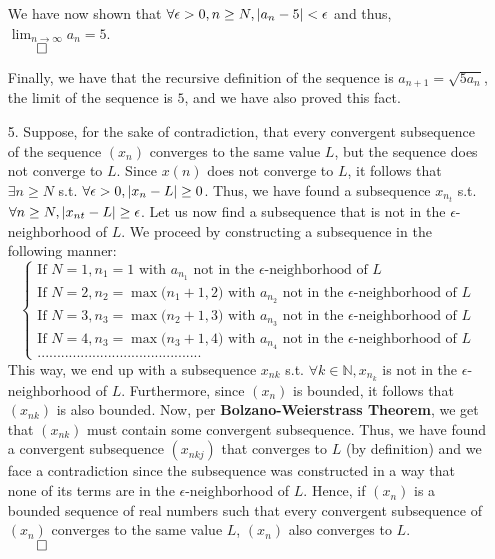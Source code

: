 \documentclass[11pt]{article}
\DeclarePairedDelimiter\abs{\lvert}{\rvert}%
\newcommand{\nats}{\mathbb{N}}
\begin{document}
\begin{itemize}
            We have now shown that $\forall \epsilon > 0, n \geq N, \abs{a_n - 5}
            < \epsilon$ and thus, $\displaystyle\lim_{n \to \infty} a_n = 5$.\\
            $\qed$

            Finally, we have that the recursive definition of the sequence is
            $a_{n + 1} = \sqrt{5a_{n}}$, the limit of the sequence is $5$, and
            we have also proved this fact.

        \newpage
        \item[5.]
            Suppose, for the sake of contradiction, that every convergent
            subsequence of the sequence $(x_n)$ converges to the same value
            $L$, but the sequence does not converge to $L$. Since $x(n)$ does
            not converge to $L$, it follows that $\exists n \geq N$ s.t.
            $\forall \epsilon > 0, \abs{x_n - L} \geq 0$. Thus, we have found a
            subsequence $x_{n_t}$ s.t. $\forall n \geq N, \abs{x_{nt} - L} \geq
            \epsilon$. Let us now find a subsequence that is not in the
            $\epsilon$-neighborhood of $L$. We proceed by constructing a
            subsequence in the following manner:
            \begin{equation*}
                \begin{cases}
                    \text{If } N = 1, n_1 = 1                  \text{ with } a_{n_1} \text{ not in the $\epsilon$-neighborhood of } L\\
                    \text{If } N = 2, n_2 = \max{(n_1 + 1, 2}) \text{ with } a_{n_2} \text{ not in the $\epsilon$-neighborhood of } L\\
                    \text{If } N = 3, n_3 = \max{(n_2 + 1, 3}) \text{ with } a_{n_3} \text{ not in the $\epsilon$-neighborhood of } L\\
                    \text{If } N = 4, n_3 = \max{(n_3 + 1, 4}) \text{ with } a_{n_4} \text{ not in the $\epsilon$-neighborhood of } L\\
                    ..........................................
                \end{cases}
            \end{equation*}
            This way, we end up with a subsequence $x_{nk}$ s.t. $\forall k \in
            \nats, x_{n_k}$ is not in the $\epsilon$-neighborhood of $L$.
            Furthermore, since $(x_n)$ is bounded, it follows that $(x_{nk})$
            is also bounded. Now, per \textbf{Bolzano-Weierstrass Theorem}, we
            get that $(x_{nk})$ must contain some convergent subsequence. Thus,
            we have found a convergent subsequence $(x_{nkj})$ that converges
            to $L$ (by definition) and we face a contradiction since the
            subsequence was constructed in a way that none of its terms are in
            the $\epsilon$-neighborhood of $L$. Hence, if $(x_n)$ is a bounded
            sequence of real numbers such that every convergent subsequence of
            $(x_n)$ converges to the same value $L$, $(x_n)$ also converges to
            $L$.\\
            $\qed$


\end{itemize}
\end{document}
